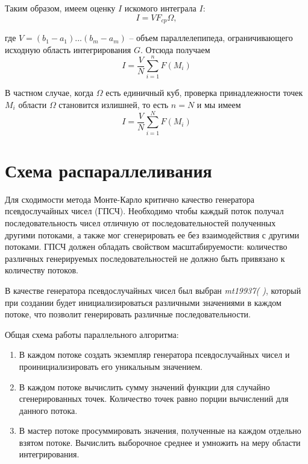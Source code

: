 \documentclass{report}
\begin{document}
\par Таким образом, имеем оценку $I$ искомого интеграла $I$:
\begin{equation}I = V F_{cp} \Omega ,\end{equation}
\par где $V = (b_{1} - a_{1})...(b_{m} - a_{m})$ – объем параллелепипеда, ограничивающего исходную область интегрирования $G$. Отсюда получаем
\begin{equation}I = \frac{V}{N}\sum_{i=1}^{n}{F(M_{i})} \end{equation}
\par В частном случае, когда $\Omega$ есть единичный куб, проверка принадлежности точек $M_{i}$ области $\Omega$ становится излишней, то есть $n = N$ и мы имеем
\begin{equation}I = \frac{V}{N}\sum_{i=1}^{N}{F(M_{i})} \end{equation}

\newpage

\section*{Схема распараллеливания}
Для сходимости метода Монте-Карло критично качество генератора псевдослучайных чисел (ГПСЧ). Необходимо чтобы каждый поток получал последовательность чисел отличную от последовательностей полученных другими потоками, а также мог сгенерировать ее без взаимодействия с другими потоками. ГПСЧ должен обладать свойством масштабируемости: количество различных генерируемых последовательностей не должно быть привязано к количеству потоков.
\par В качестве генератора псевдослучайных чисел был выбран \emph{mt19937( )}, который при создании будет инициализироваться различными значениями в каждом потоке, что позволит генерировать различные последовательности. 
\par Общая схема работы параллельного алгоритма:
\begin{enumerate}
\item В каждом потоке создать экземпляр генератора псевдослучайных чисел и проинициализировать его уникальным значением.
\item В каждом потоке вычислить сумму значений функции для случайно сгенерированных точек. Количество точек равно порции вычислений для данного потока.
\item В мастер потоке просуммировать значения, полученные на каждом отдельно взятом потоке. Вычислить выборочное среднее и умножить на меру области интегрирования.
\end{enumerate}
\newpage
\end{document}
